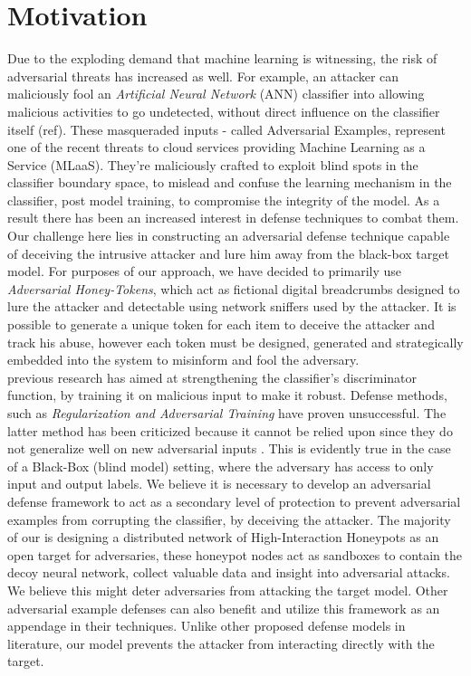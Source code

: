 \documentclass[grad,lot,lof,11pt,oneside,onehalfspace]{RUthesis}
\begin{document}
\section{Motivation}
  Due to the exploding demand that machine learning is witnessing, the risk of adversarial threats has increased as well. For example, an attacker can maliciously fool an \textit{Artificial Neural Network} (ANN) classifier into allowing malicious activities to go undetected, without direct influence on the classifier itself (ref). These masqueraded inputs - called Adversarial Examples, represent one of the recent threats to cloud services providing Machine Learning as a Service (MLaaS). They’re maliciously crafted to exploit blind spots in the classifier boundary space, to mislead and confuse the learning mechanism in the classifier, post model training, to compromise the integrity of the model. As a result there has been an increased interest in defense techniques to combat them. \\
  Our challenge here lies in constructing an adversarial defense technique capable of deceiving the intrusive attacker and lure him away from the black-box target model. For purposes of our approach, we have decided to primarily use \textit{Adversarial Honey-Tokens}, which act as fictional digital breadcrumbs designed to lure the attacker and detectable using network sniffers used by the attacker. It is possible to generate a unique token for each item to deceive the attacker and track his abuse, however each token must be designed, generated and strategically embedded into the system to misinform and fool the adversary.\\
  previous research has aimed at strengthening the classifier’s discriminator function, by training it on malicious input to make it robust. Defense methods,  such as \textit{Regularization and Adversarial Training} have proven unsuccessful. The latter method has been criticized because it cannot be relied upon since they do not generalize well on new adversarial inputs \cite{rozsa_towards_2016}.  This is evidently true in the case of a Black-Box (blind model) setting, where the adversary has access to only input and output labels. We believe it is necessary to develop an adversarial defense framework to act as a secondary level of protection to prevent adversarial examples from corrupting the classifier, by deceiving the attacker. The majority of our is designing a distributed network of High-Interaction Honeypots as an open target for adversaries, these honeypot nodes act as sandboxes to contain the decoy neural network, collect valuable data and insight into adversarial attacks. We believe this might deter adversaries from attacking the target model. Other adversarial example defenses can also benefit and utilize this framework as an appendage in their techniques. Unlike other proposed defense models in literature, our model prevents the attacker from interacting directly with the target.\\
\end{document}
